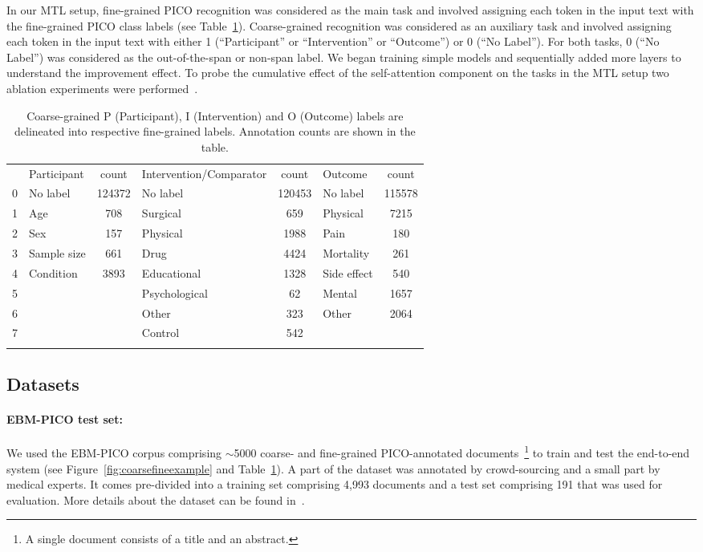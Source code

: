 \documentclass[runningheads]{llncs}
\begin{document}
In our MTL setup, fine-grained PICO recognition was considered as the main task and involved assigning each token in the input text with the fine-grained PICO class labels (see Table~\ref{table:coarsefineconcept}).
Coarse-grained recognition was considered as an auxiliary task and involved assigning each token in the input text with either 1 (``Participant'' or ``Intervention'' or ``Outcome'') or 0 (``No Label'').
For both tasks, 0 (``No Label'') was considered as the out-of-the-span or non-span label.
We began training simple models and sequentially added more layers to understand the improvement effect.
To probe the cumulative effect of the self-attention component on the tasks in the MTL setup two ablation experiments were performed~\cite{vaswani2017attention}.
%
\begingroup
\setlength{\tabcolsep}{5pt} %
\renewcommand{\arraystretch}{1.0}
\begin{table}[h!]
\begin{center}
\caption{Coarse-grained P (Participant), I (Intervention) and O (Outcome) labels are delineated into respective fine-grained labels. Annotation counts are shown in the table.}
\label{table:coarsefineconcept}
\begin{tabular}{ c  l  c  l  c  l  c } 
\Xhline{1pt}
& Participant & count & Intervention/Comparator & count  & Outcome & count  \\ 
\Xhline{1pt}
0 & No label & 124372 & No label & 120453 & No label & 115578\\ 
1 & Age & 708 & Surgical & 659  & Physical & 7215\\ 
2 & Sex & 157 & Physical & 1988 & Pain & 180\\
3 & Sample size & 661 & Drug & 4424 & Mortality & 261\\
4 & Condition & 3893 & Educational & 1328 & Side effect & 540\\
5 & & & Psychological & 62 & Mental & 1657\\
6 & & & Other & 323 & Other & 2064\\
7 & & & Control & 542 & & \\
\Xhline{1pt}
\end{tabular}
\end{center}
\end{table}
\endgroup
%
%
\subsection{Datasets}
\label{subsec:datasets}
%
\paragraph{EBM-PICO test set: }
%
We used the EBM-PICO corpus comprising $\sim$5000 coarse- and fine-grained PICO-annotated documents~\footnote{A single document consists of a title and an abstract.} to train and test the end-to-end system (see Figure~\ref{fig:coarsefineexample} and Table~\ref{table:coarsefineconcept}).
A part of the dataset was annotated by crowd-sourcing and a small part by medical experts.
It comes pre-divided into a training set comprising 4,993 documents and a test set comprising 191 that was used for evaluation.
More details about the dataset can be found in~\cite{nye2018corpus}.
%
\end{document}
